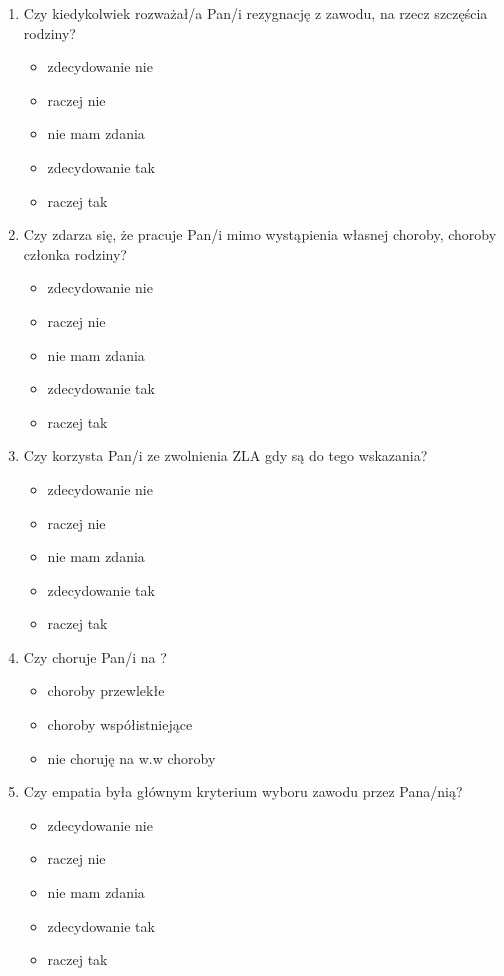 \documentclass[a4paper,12pt,twoside,openright]{mwrep}
\begin{document}
\begin{appendices}
\begin{enumerate}[label=\arabic*)]
			\item{Czy kiedykolwiek rozważał/a Pan/i rezygnację z zawodu, na rzecz szczęścia rodziny?}
		\begin{itemize}
			\item{zdecydowanie nie}
			\item{raczej nie}
			\item{nie mam zdania}
			\item{zdecydowanie tak}
			\item{raczej tak}
		\end{itemize}
		\vspace{\baselineskip}
		
			\item{Czy zdarza się, że pracuje Pan/i mimo wystąpienia własnej choroby, choroby członka rodziny?}
		\begin{itemize}
			\item{zdecydowanie nie}
			\item{raczej nie}
			\item{nie mam zdania}
			\item{zdecydowanie tak}
			\item{raczej tak}
		\end{itemize}
		\vspace{\baselineskip}
		
			\item{ Czy korzysta Pan/i ze zwolnienia ZLA gdy są do tego wskazania?}
		\begin{itemize}
			\item{zdecydowanie nie}
			\item{raczej nie}
			\item{nie mam zdania}
			\item{zdecydowanie tak}
			\item{raczej tak}
		\end{itemize}
		\vspace{5pt}
		
			\item{Czy choruje Pan/i  na ?}
		\begin{itemize}
			\item{choroby przewlekłe}
			\item{choroby współistniejące}
			\item{nie choruję na w.w choroby}
			\end{itemize}
		\vspace{5pt}
		
			\item{Czy empatia była głównym kryterium wyboru zawodu przez Pana/nią?}
		\begin{itemize}
			\item{zdecydowanie nie}
			\item{raczej nie}
			\item{nie mam zdania}
			\item{zdecydowanie tak}
			\item{raczej tak}
		\end{itemize}
		\vspace{5pt}
		

\end{enumerate}
\end{appendices}
\end{document}
